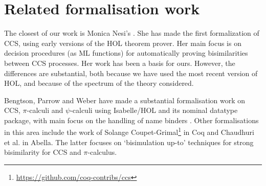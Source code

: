 \section{Related formalisation work}
\label{s:rel}

The closest of our work is Monica Nesi's \cite{Nesi:1992ve,Nesi:2017wo}. She has made
the first formalization of CCS,  using early versions of the HOL theorem prover.
Her main focus is  on
 decision procedures (as ML functions) for
automatically proving bisimilarities between CCS
processes.  Her work has been a basis for ours. However, the differences are substantial,
both because we have used the most recent version of HOL, and because of the spectrum of
the theory considered.

Bengtson,  Parrow and Weber
have made a substantial formalisation work 
on CCS, $\pi$-calculi
and $\psi$-calculi 
using Isabelle/HOL and its nominal datatype package, with main focus on the handling of
name binders \cite{bengtson2010formalising,bengtson2007completeness,bengtson2007formalising}.
%
Other formalisations in this area include the work of Solange
Coupet-Grimal\footnote{\url{https://github.com/coq-contribs/ccs}} in Coq
and Chaudhuri et al.\;\cite{chaudhuri2015lightweight} in Abella. The
latter focuses on `bisimulation up-to' techniques for strong bisimilarity 
for CCS and $\pi$-calculus.
